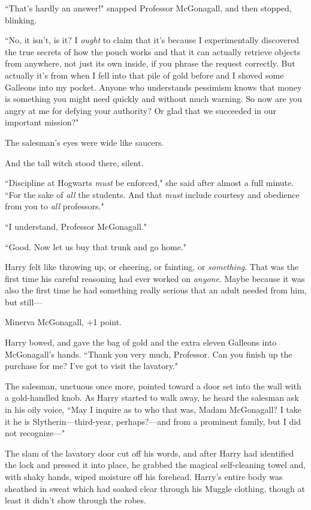 ``That's hardly an answer!" snapped Professor McGonagall, and then stopped, blinking.

``No, it isn't, is it? I \emph{ought} to claim that it's because I experimentally discovered the true secrets of how the pouch works and that it can actually retrieve objects from anywhere, not just its own inside, if you phrase the request correctly. But actually it's from when I fell into that pile of gold before and I shoved some Galleons into my pocket. Anyone who understands pessimism knows that money is something you might need quickly and without much warning. So now are you angry at me for defying your authority? Or glad that we succeeded in our important mission?"

The salesman's eyes were wide like saucers.

And the tall witch stood there, silent.

``Discipline at Hogwarts \emph{must} be enforced," she said after almost a full minute. ``For the sake of \emph{all} the students. And that \emph{must} include courtesy and obedience from you to \emph{all} professors."

``I understand, Professor McGonagall."

``Good. Now let us buy that trunk and go home."

Harry felt like throwing up, or cheering, or fainting, or \emph{something}. That was the first time his careful reasoning had ever worked on \emph{anyone}. Maybe because it was also the first time he had something really serious that an adult needed from him, but still—

Minerva McGonagall, +1 point.

Harry bowed, and gave the bag of gold and the extra eleven Galleons into McGonagall's hands. ``Thank you very much, Professor. Can you finish up the purchase for me? I've got to visit the lavatory."

The salesman, unctuous once more, pointed toward a door set into the wall with a gold-handled knob. As Harry started to walk away, he heard the salesman ask in his oily voice, ``May I inquire as to who that was, Madam McGonagall? I take it he is Slytherin—third-year, perhaps?—and from a prominent family, but I did not recognize—"

The slam of the lavatory door cut off his words, and after Harry had identified the lock and pressed it into place, he grabbed the magical self-cleaning towel and, with shaky hands, wiped moisture off his forehead. Harry's entire body was sheathed in sweat which had soaked clear through his Muggle clothing, though at least it didn't show through the robes.

